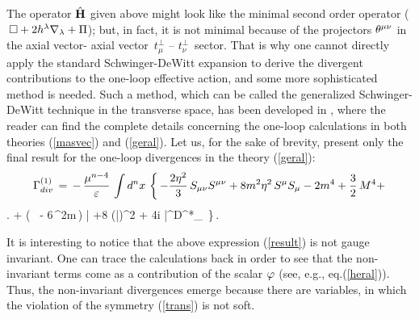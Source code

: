 The operator ${\hat {\bf H}}$ given above might look like the
minimal second order operator ($\,\Box + 2h^\lambda\nabla_\lambda + \Pi$); 
but, in fact, it is not minimal because of the projectors
$\theta^{\mu\nu}$ in the axial vector- axial vector
$\,t^{\perp}_{\mu}$ -- $t^{\perp}_{\nu}\,$ sector.
That is why one cannot directly
apply the standard Schwinger-DeWitt expansion to derive the
divergent contributions to the one-loop effective action,
and some more sophisticated method is needed.
Such a method, which can be called the generalized 
Schwinger-DeWitt technique in the transverse space,  
has been developed in \cite{guhesh}, where the reader 
can find the complete details concerning the one-loop 
calculations in both theories (\ref{masvec}) and 
(\ref{geral}). Let us, for the sake of brevity,
present only the final result for the one-loop divergences
in the theory (\ref{geral}):
$$
\Gamma^{(1)}_{div} \,= \,- \,\frac{\mu^{n-4}}{\varepsilon}\,
\int d^n x \,\left\{ \,-\frac{2\eta^2}{3}\,S_{\mu\nu}S^{\mu\nu}
+ 8m^2\eta^2\,S^\mu S_\mu - 2m^4 + \frac{3}{2}\,M^4 +
\right.
$$
\beq
\left.
+ \Big( \, 
- 6\,\eta^2m\,\Big) \bar{\psi}\psi 
+8\,\,(\bar{\psi}\psi)^2 +
4i\,\,\bar{\psi}\ga^\mu D^{*}_\mu \psi 
\,\right\}\,.
\label{result}
\eeq

It is interesting to notice that the above expression
(\ref{result}) is not
gauge invariant. One can trace the calculations back in order to 
see that the non-invariant
terms come as a contribution of the scalar $\varphi$
(see, e.g., eq.(\ref{heral})). Thus, the non-invariant divergences
emerge because there are variables, in which  
the violation of the symmetry (\ref{trans}) is not soft. 

